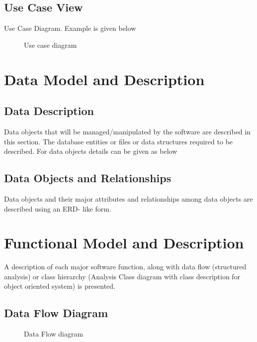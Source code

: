 \documentclass[oneside,a4paper,12pt]{book}
\begin{document}
\begin{enumerate}
\begin{itemize}
\subsection{Use Case View}
Use Case Diagram. Example is given below
\begin{center}
	\begin{figure}[!htbp]
		\centering
	  \caption{Use case diagram}
	  \label{fig:usecase}
	\end{figure}
\end{center}  

\section{Data Model and Description}  
\subsection{Data Description}  
Data objects that will be managed/manipulated by the software are described in this section. The database entities or files or data structures  required to be described. For data objects details can be given as below
\subsection{Data Objects and Relationships}
  Data objects and their major attributes and relationships among data objects are described using an ERD- like form.

 
 
\section{Functional Model and Description}  
A description of each major software function, along with data flow (structured analysis) or class hierarchy (Analysis Class diagram with class description for object oriented system) is presented. 
\subsection{Data Flow Diagram}  
\begin{center}
	\begin{figure}[!htbp]
		\centering
	  \caption{Data Flow diagram}
	  \label{fig:usecase}
	\end{figure}
\end{center}
\newpage




\end{itemize}
\end{enumerate}
\end{document}
